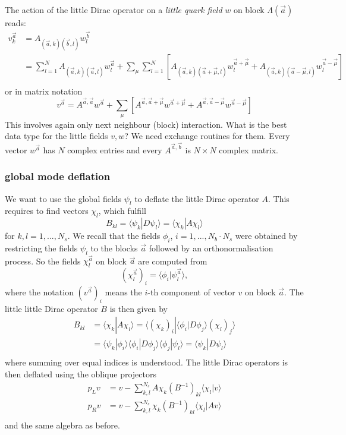 The action of the little Dirac operator on a \emph{little
  quark field} $w$ on block $\Lambda(\vec a)$ reads:
\[
\begin{split}
  v_k^{\vec a} &= A_{(\vec a,k)(\vec b, l)} w_l^{\vec b}\\
  &= \sum_{l=1}^N  A_{(\vec a,k)(\vec a, l)} w_l^{\vec a} + 
  \sum_{\mu} \sum_{l=1}^N [A_{(\vec a,k)(\vec a+\vec\mu, l)} w_l^{\vec
    a+\vec\mu} + A_{(\vec a,k)(\vec a-\vec\mu, l)} w_l^{\vec a - \vec\mu}]\\
\end{split}
\]
or in matrix notation
\[
v^{\vec a} = A^{\vec a,\vec a} w^{\vec a} + \sum_\mu [A^{\vec a,\vec
  a+\vec\mu} w^{\vec a+\vec\mu} +  A^{\vec a,\vec a-\vec\mu} w^{\vec a-\vec\mu}]
\]
This involves again only next neighbour (block) interaction. What is
the best data type for the little fields $v,w$? We need exchange
routines for them. Every vector $w^{\vec a}$ has $N$ complex entries
and every $A^{\vec a,\vec b}$ is $N\times N$ complex matrix. 

\subsubsection{global mode deflation}

We want to use the global fields $\psi_l$ to deflate the little Dirac
operator $A$. This requires to find vectors $\chi_l$, which fulfill
\begin{equation}
  \label{eq:llD}
  B_{kl} = \langle\psi_k|D \psi_l\rangle = \langle\chi_k|A \chi_l\rangle
\end{equation}
for $k,l = 1,...,N_s$. We recall that the fields $\phi_i$, $i=
1,...,N_b\cdot N_s$ were obtained by restricting the fields $\psi_l$ to
the blocks $\vec a$ followed by an orthonormalisation process. So the
fields $\chi_l^{\vec a}$ on block $\vec a$ are computed from
\begin{equation}
  \label{eq:chis}
  (\chi^{\vec a}_l)_i = \langle\phi_i|\psi_l^{\vec a}\rangle,
\end{equation}
where the notation $(v^{\vec a})_i$ means the $i$-th component of
vector $v$ on block $\vec a$. The little little Dirac operator $B$ is
then given by
\[
\begin{split}
  B_{kl} &= \langle\chi_k|A \chi_l\rangle =
  \langle(\chi_k)_i|\langle\phi_i|D \phi_j\rangle (\chi_l)_j\rangle\\
  &= \langle\psi_k|\phi_i\rangle\langle\phi_i|D
  \phi_j\rangle\langle\phi_j |\psi_l\rangle = \langle\psi_k|D \psi_l\rangle \\
\end{split}
\]
where summing over equal indices is understood. The little Dirac
operators is then deflated using the oblique projectors
\[
\begin{split}
  p_L v &= v - \sum_{k,l}^{N_s}
  A\chi_k(B^{-1})_{kl}\langle\chi_l|v\rangle\\
  p_R v &= v - \sum_{k,l}^{N_s}
  \chi_k(B^{-1})_{kl}\langle\chi_l|A v\rangle\\
\end{split}
\]
and the same algebra as before.

